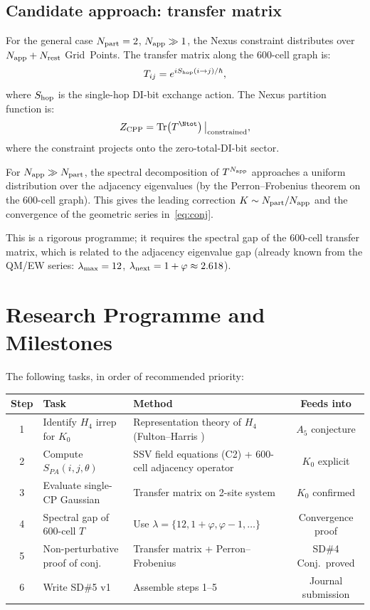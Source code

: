 \documentclass[11pt,a4paper]{article}
\newcommand{\phig}{\varphi}
\newcommand{\Napp}{N_{\rm app}}
\newcommand{\Npart}{N_{\rm part}}
\begin{document}
\subsection{Candidate approach: transfer matrix}

For the general case $\Npart = 2$, $\Napp \gg 1$, the Nexus
constraint distributes over $\Napp + N_{\rm rest}$ Grid~Points.
The transfer matrix along the 600-cell graph is:
\begin{equation}
T_{ij} = e^{i S_{\rm hop}(i \to j) / \hbar},
\label{eq:transfer}
\end{equation}
where $S_{\rm hop}$ is the single-hop DI-bit exchange action.
The Nexus partition function is:
\begin{equation}
Z_{\rm CPP} = \text{Tr}\!\left(T^{\Ntot}\right)\big|_{\rm constrained},
\label{eq:Z_transfer}
\end{equation}
where the constraint projects onto the zero-total-DI-bit sector.

For $\Napp \gg \Npart$, the spectral decomposition of $T^{\Napp}$
approaches a uniform distribution over the adjacency eigenvalues
(by the Perron--Frobenius theorem on the 600-cell graph).  This
gives the leading correction $K \sim \Npart/\Napp$ and the
convergence of the geometric series in~\eqref{eq:conj}.

This is a rigorous programme; it requires the spectral gap of the
600-cell transfer matrix, which is related to the adjacency
eigenvalue gap (already known from the QM/EW series:
$\lambda_{\rm max} = 12$, $\lambda_{\rm next} = 1+\phig \approx
2.618$).

\section{Research Programme and Milestones}

The following tasks, in order of recommended priority:

\begin{center}
\begin{tabular}{@{}clp{6cm}c@{}}
\toprule
Step & Task & Method & Feeds into \\
\midrule
1 & Identify $H_4$ irrep for $K_0$ & Representation theory of $H_4$
  (Fulton--Harris \citep{fulton1991}) & $A_5$ conjecture \\[4pt]
2 & Compute $S_{PA}(i,j,\theta)$ & SSV field equations (C2)
  + 600-cell adjacency operator & $K_0$ explicit \\[4pt]
3 & Evaluate single-CP Gaussian & Transfer matrix on 2-site
  system & $K_0$ confirmed \\[4pt]
4 & Spectral gap of 600-cell $T$ & Use $\lambda = \{12, 1+\phig,
  \phig-1, \ldots\}$ & Convergence proof \\[4pt]
5 & Non-perturbative proof of conj. & Transfer matrix + Perron--Frobenius
  & SD\#4 Conj.\ proved \\[4pt]
6 & Write SD\#5 v1 & Assemble steps 1--5 & Journal submission \\
\bottomrule
\end{tabular}
\end{center}
\end{document}
